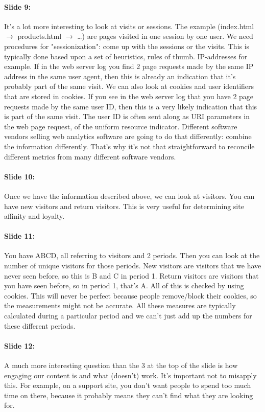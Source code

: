 \documentclass[10pt,a4paper]{report}
\begin{document}
\paragraph{Slide 9:}It's a lot more interesting to look at visits or sessions. The example (index.html $\rightarrow$ products.html $\rightarrow$ …) are pages visited in one session by one user.
We need procedures for "sessionization": come up with the sessions or the visits. This is typically done based upon a set of heuristics, rules of thumb. IP-addresses for example. If in the web server log you find 2 page requests made by the same IP address in the same user agent, then this is already an indication that it's probably part of the same visit. We can also look at cookies and user identifiers that are stored in cookies. If you see in the web server log that you have 2 page requests made by the same user ID, then this is a very likely indication that this is part of the same visit. The user ID is often sent along as URI parameters in the web page request, of the uniform resource indicator. Different software vendors selling web analytics software are going to do that differently: combine the information differently. That's why it's not that straightforward to reconcile different metrics from many different software vendors.

\paragraph{Slide 10:}Once we have the information described above, we can look at visitors. You can have new visitors and return visitors. This is very useful for determining site affinity and loyalty.

\paragraph{Slide 11:}You have ABCD, all referring to visitors and 2 periods. Then  you can look at the number of unique visitors for those periods. New visitors are visitors that we have never seen before, so this is B and C in period 1. Return visitors are visitors that you have seen before, so in period 1, that's A. All of this is checked by using cookies. This will never be perfect because people remove/block their cookies, so the measurements might not be accurate. All these measures are typically calculated during a particular period and we can't just add up the numbers for these different periods. 

\paragraph{Slide 12:}A much more interesting question than the 3 at the top of the slide is how engaging our content is and what (doesn’t) work. It's important not to misapply this. For example, on a support site, you don't want people to spend too much time on there, because it probably means they can't find what they are looking for.
\end{document}
